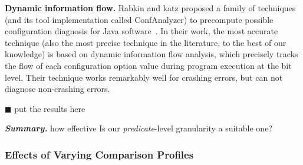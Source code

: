 \vspace{1mm}
\noindent \textbf{Dynamic information flow.}
Rabkin and katz proposed a family of techniques (and its tool implementation called ConfAnalyzer)
to precompute possible
configuration diagnosis for Java software~\cite{Rabkin:2011:PPC}. In their work,
the most accurate technique (also the most precise technique in the literature,
to the best of our knowledge) is based on dynamic information flow analysis, which precisely
tracks the flow of each configuration option value during program execution at the bit level.
Their technique works remarkably well for crashing errors, but can
not diagnose non-crashing errors.

\vspace{1mm}
$\blacksquare$ put the results here

\vspace{1mm}
\noindent \textbf{\textit{Summary.}} how effective
Is our \textit{predicate}-level granularity a suitable one?

\subsubsection{Effects of Varying Comparison Profiles}
\label{sec:ranking}


